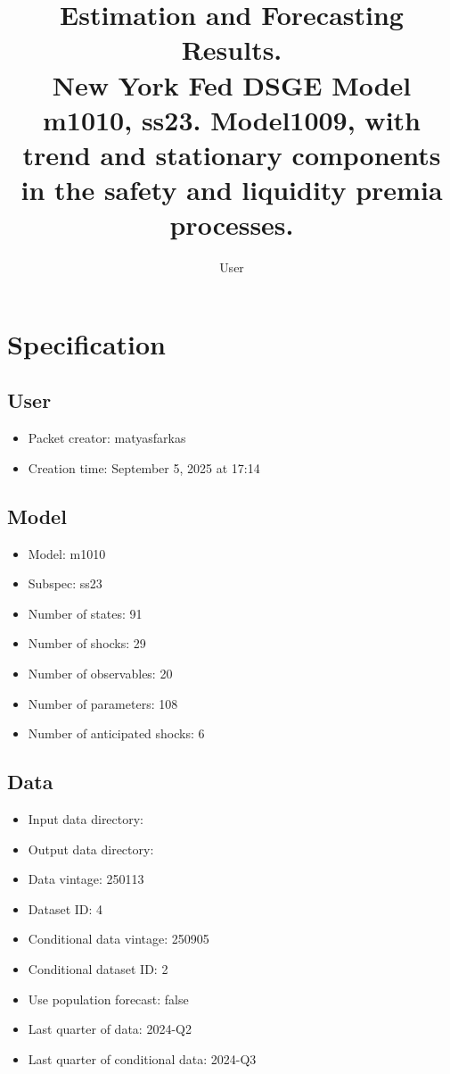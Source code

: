 \documentclass{article}
\title{Estimation and Forecasting Results. \\ New York Fed DSGE Model m1010, ss23. Model1009, with trend and stationary components in the safety and liquidity premia processes.}
\author{User}
\begin{document}
\maketitle


\section{Specification}

\subsection{User}

\begin{itemize}
  \item Packet creator: matyasfarkas
  \item Creation time: September 5, 2025 at 17:14
\end{itemize}

\subsection{Model}

\begin{itemize}
  \item Model: m1010
  \item Subspec: ss23
  \item Number of states: 91
  \item Number of shocks: 29
  \item Number of observables: 20
  \item Number of parameters: 108
  \item Number of anticipated shocks: 6
\end{itemize}

\subsection{Data}

\begin{itemize}
  \item Input data directory: 
  \item Output data directory: 
  \item Data vintage: 250113
  \item Dataset ID: 4
  \item Conditional data vintage: 250905
  \item Conditional dataset ID: 2
  \item Use population forecast: false
  \item Last quarter of data: 2024-Q2
  \item Last quarter of conditional data: 2024-Q3
\end{itemize}
\end{document}
